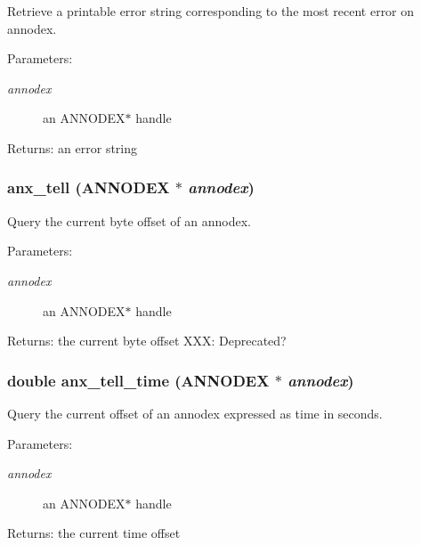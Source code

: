 Retrieve a printable error string corresponding to the most recent error on annodex. 

\begin{Desc}
\item[Parameters:]
\begin{description}
\item[{\em annodex}]an ANNODEX$\ast$ handle \end{description}
\end{Desc}
\begin{Desc}
\item[Returns:]an error string \end{Desc}
\subsubsection{ anx\_\-tell ({\bf ANNODEX} $\ast$ {\em annodex})}\label{anx__general_8h_a13}


Query the current byte offset of an annodex. 

\begin{Desc}
\item[Parameters:]
\begin{description}
\item[{\em annodex}]an ANNODEX$\ast$ handle \end{description}
\end{Desc}
\begin{Desc}
\item[Returns:]the current byte offset XXX: Deprecated? \end{Desc}
\subsubsection{\setlength{\rightskip}{0pt plus 5cm}double anx\_\-tell\_\-time ({\bf ANNODEX} $\ast$ {\em annodex})}\label{anx__general_8h_a17}


Query the current offset of an annodex expressed as time in seconds. 

\begin{Desc}
\item[Parameters:]
\begin{description}
\item[{\em annodex}]an ANNODEX$\ast$ handle \end{description}
\end{Desc}
\begin{Desc}
\item[Returns:]the current time offset \end{Desc}
